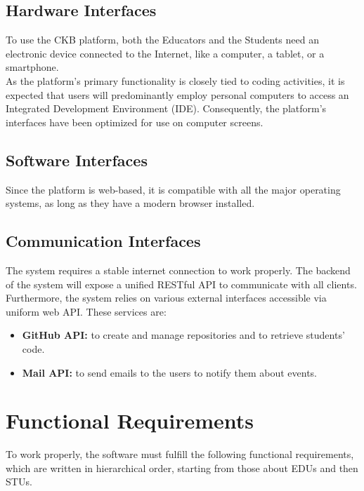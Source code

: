 \subsection{Hardware Interfaces}
To use the CKB platform, both the Educators and the Students need an electronic device connected to the Internet, like a computer, a tablet, or a smartphone.\\
As the platform's primary functionality is closely tied to coding activities, it is expected that users will predominantly employ personal computers to access an Integrated Development Environment (IDE).
Consequently, the platform's interfaces have been optimized for use on computer screens.

\subsection{Software Interfaces}
Since the platform is web-based, it is compatible with all the major operating systems, as long as they have a modern browser installed.

\subsection{Communication Interfaces}
The system requires a stable internet connection to work properly.
The backend of the system will expose a unified RESTful API to communicate with all clients.\\
Furthermore, the system relies on various external interfaces accessible via uniform web API.
These services are:
\begin{itemize}
    \item \textbf{GitHub API:} to create and manage repositories and to retrieve students' code.
    \item \textbf{Mail API:} to send emails to the users to notify them about events.
\end{itemize}

\section{Functional Requirements}
To work properly, the software must fulfill the following functional requirements, which are written in hierarchical order, starting from those about EDUs and then STUs.

